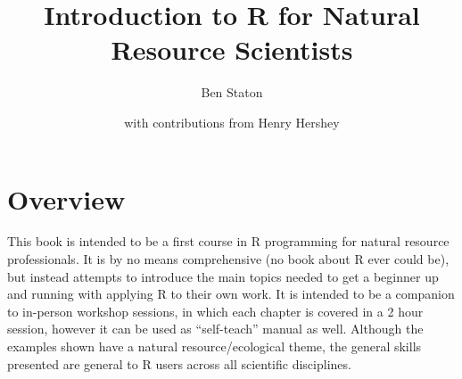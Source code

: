 \documentclass[]{book}
\title{Introduction to R for Natural Resource Scientists}
\author{Ben Staton}
\date{with contributions from Henry Hershey}
\let\oldmaketitle\maketitle
\theoremstyle{definition}
\theoremstyle{definition}
\theoremstyle{definition}
\theoremstyle{remark}
\begin{document}
\maketitle

% 



\thispagestyle{empty}
\let\maketitle\oldmaketitle
\maketitle
\thispagestyle{empty}

{
\hypersetup{linkcolor=black}
\setcounter{tocdepth}{1}
\tableofcontents
}
\chapter*{Overview}\label{overview}

This book is intended to be a first course in R programming for natural
resource professionals. It is by no means comprehensive (no book about R
ever could be), but instead attempts to introduce the main topics needed
to get a beginner up and running with applying R to their own work. It
is intended to be a companion to in-person workshop sessions, in which
each chapter is covered in a 2 hour session, however it can be used as
``self-teach'' manual as well. Although the examples shown have a
natural resource/ecological theme, the general skills presented are
general to R users across all scientific disciplines.
\end{document}
